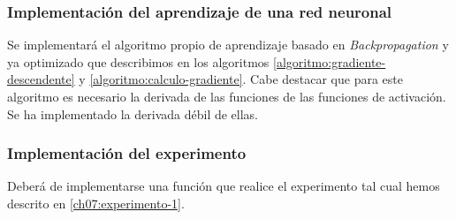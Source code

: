 \subsubsection{Implementación del aprendizaje de una red neuronal} 
Se implementará el algoritmo propio de aprendizaje basado en \textit{Backpropagation} y ya optimizado 
que describimos en los algoritmos \ref{algoritmo:gradiente-descendente} y \ref{algoritmo:calculo-gradiente}.
Cabe destacar que para este algoritmo es necesario la derivada de las funciones de las funciones de activación. Se ha implementado la derivada débil de ellas. 

\subsubsection{Implementación del experimento} 
Deberá de implementarse una función que realice el 
experimento tal cual hemos descrito en \ref{ch07:experimento-1}.

